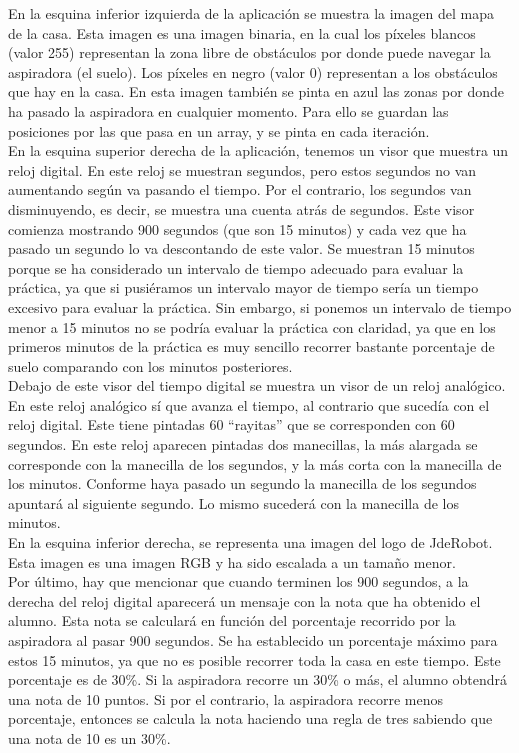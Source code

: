 En la esquina inferior izquierda de la aplicación se muestra la imagen del mapa de la casa. Esta imagen es una imagen binaria, en la cual los píxeles blancos (valor 255) representan la zona libre de obstáculos por donde puede navegar la aspiradora (el suelo). Los píxeles en negro (valor 0) representan a los obstáculos que hay en la casa. En esta imagen también se pinta en azul las zonas por donde ha pasado la aspiradora en cualquier momento. Para ello se guardan las posiciones por las que pasa en un array, y se pinta en cada iteración.\\

En la esquina superior derecha de la aplicación, tenemos un visor que muestra un reloj digital. En este reloj se muestran segundos, pero estos segundos no van aumentando según va pasando el tiempo. Por el contrario, los segundos van disminuyendo, es decir, se muestra una cuenta atrás de segundos. Este visor comienza mostrando 900 segundos (que son 15 minutos) y cada vez que ha pasado un segundo lo va descontando de este valor. Se muestran 15 minutos porque se ha considerado un intervalo de tiempo adecuado para evaluar la práctica, ya que si pusiéramos un intervalo mayor de tiempo sería un tiempo excesivo para evaluar la práctica. Sin embargo, si ponemos un intervalo de tiempo menor a 15 minutos no se podría evaluar la práctica con claridad, ya que en los primeros minutos de la práctica es muy sencillo recorrer bastante porcentaje de suelo comparando con los minutos posteriores.\\

Debajo de este visor del tiempo digital se muestra un visor de un reloj analógico. En este reloj analógico sí que avanza el tiempo, al contrario que sucedía con el reloj digital. Este tiene pintadas 60 ``rayitas'' que se corresponden con 60 segundos. En este reloj aparecen pintadas dos manecillas, la más alargada se corresponde con la manecilla de los segundos, y la más corta con la manecilla de los minutos. Conforme haya pasado un segundo la manecilla de los segundos apuntará al siguiente segundo. Lo mismo sucederá con la manecilla de los minutos.\\

En la esquina inferior derecha, se representa una imagen del logo de JdeRobot. Esta imagen es una imagen RGB y ha sido escalada a un tamaño menor.\\

Por último, hay que mencionar que cuando terminen los 900 segundos, a la derecha del reloj digital aparecerá un mensaje con la nota que ha obtenido el alumno. Esta nota se calculará en función del porcentaje recorrido por la aspiradora al pasar 900 segundos. Se ha establecido un porcentaje máximo para estos 15 minutos, ya que no es posible recorrer toda la casa en este tiempo. Este porcentaje es de 30\%. Si la aspiradora recorre un 30\% o más, el alumno obtendrá una nota de 10 puntos. Si por el contrario, la aspiradora recorre menos porcentaje, entonces se calcula la nota haciendo una regla de tres sabiendo que una nota de 10 es un 30\%.\\

